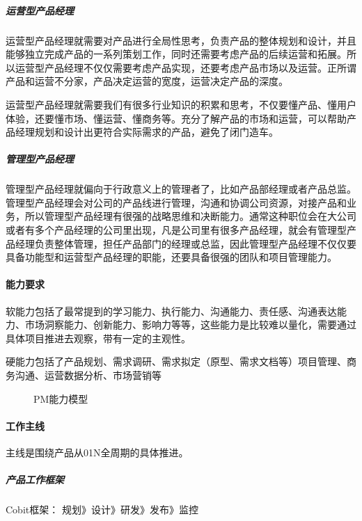 \documentclass[letterpaper,11pt,english]{sphinxmanual}
\begin{document}
\subparagraph{运营型产品经理}
\label{\detokenize{chapter_introduction/PM:id20}}
运营型产品经理就需要对产品进行全局性思考，负责产品的整体规划和设计，并且能够独立完成产品的一系列策划工作，同时还需要考虑产品的后续运营和拓展。所以运营型产品经理不仅仅需要考虑产品实现，还要考虑产品市场以及运营。正所谓产品和运营不分家，产品决定运营的宽度，运营决定产品的深度。

运营型产品经理就需要我们有很多行业知识的积累和思考，不仅要懂产品、懂用户体验，还要懂市场、懂运营、懂商务等。充分了解产品的市场和运营，可以帮助产品经理规划和设计出更符合实际需求的产品，避免了闭门造车。


\subparagraph{管理型产品经理}
\label{\detokenize{chapter_introduction/PM:id21}}
管理型产品经理就偏向于行政意义上的管理者了，比如产品部经理或者产品总监。管理型产品经理会对公司的产品线进行管理，沟通和协调公司资源，对接产品和业务，所以管理型产品经理有很强的战略思维和决断能力。通常这种职位会在大公司或者有多个产品经理的公司里出现，凡是公司里有很多产品经理，就会有管理型产品经理负责整体管理，担任产品部门的经理或总监，因此管理型产品经理不仅仅要具备功能型和运营型产品经理的职能，还要具备很强的团队和项目管理能力。


\paragraph{能力要求}
\label{\detokenize{chapter_introduction/PM:id22}}
软能力包括了最常提到的学习能力、执行能力、沟通能力、责任感、沟通表达能力、市场洞察能力、创新能力、影响力等等，这些能力是比较难以量化，需要通过具体项目推进去观察，带有一定的主观性。

硬能力包括了产品规划、需求调研、需求拟定（原型、需求文档等）项目管理、商务沟通、运营数据分析、市场营销等

\begin{figure}[H]
\centering
\capstart

\noindent{}
\caption{PM能力模型}\label{\detokenize{chapter_introduction/PM:id68}}\end{figure}


\paragraph{工作主线}
\label{\detokenize{chapter_introduction/PM:id23}}
主线是围绕产品从0\sphinxhyphen{}1\sphinxhyphen{}N全周期的具体推进。


\subparagraph{产品工作框架}
\label{\detokenize{chapter_introduction/PM:id24}}
Cobit框架： 规划\sphinxhyphen{}》设计\sphinxhyphen{}》研发\sphinxhyphen{}》发布\sphinxhyphen{}》监控
\end{document}
